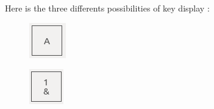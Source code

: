 Here is the three differents possibilities of key display :
\begin{figure}[H]
  \centering
  \begin{minipage}[b]{0.10\textwidth}
    \includegraphics[width=\textwidth]{images/key-one-char.png}
    \label{key-one-char}
  \end{minipage}
  \begin{minipage}[b]{0.10\textwidth}
    \includegraphics[width=\textwidth]{images/key-two-chars.png}

\end{minipage}
\end{figure}
